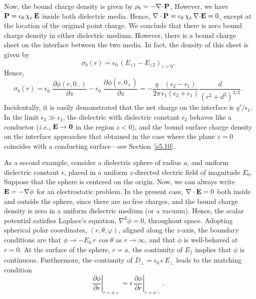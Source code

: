 Now, the bound charge density is given by $\rho_b = - \nabla\!\cdot\!
{\bf P}$, However,  we have ${\bf P}=\epsilon_0\,
\chi_e \,{\bf E}$ inside both dielectric media. Hence, $\nabla \cdot {\bf P} = \epsilon_0\,
\chi_e\, \nabla {\cdot} {\bf E} = 0$, except at the location of the original point charge. 
We conclude that there is zero  bound charge density in either dielectric
medium.  However,  
there is a bound charge sheet on the interface
between the two  media. 
In fact, the density of this sheet is given by
\begin{equation}
\sigma_b(r) = \epsilon_0\,(E_{z\,1}-E_{z\,2})_{z=0}.
\end{equation}
Hence,
\begin{equation}
\sigma_b(r) = \epsilon_0\,\,\frac{\partial\phi(r,0_-)}{\partial z}-
\epsilon_0\,\,\frac{\partial\phi(r,0_+)}{\partial z}
=-\frac{q}{2\pi} \frac{(\epsilon_2-\epsilon_1)}
{\epsilon_1(\epsilon_2+\epsilon_1)} \frac{d}{(r^2+d^2)^{3/2}}.
\end{equation}
Incidentally, it is easily demonstrated that the net charge on the interface
is $q'/\epsilon_1$. 
In the limit $\epsilon_2\gg \epsilon_1$, the dielectric with dielectric constant  $\epsilon_2$
behaves like a conductor ({\em i.e.}, ${\bf E}\rightarrow
{\bf 0}$ in the region $z<0$), 
and the bound surface charge  density 
on the interface approaches that obtained in the case where the plane
$z=0$ coincides with a conducting surface---see Section~\ref{s5.10}.

As a second example, consider a dielectric sphere of radius $a$, and
uniform dielectric constant $\epsilon$, placed in a uniform
$z$-directed electric field of magnitude $E_0$. Suppose that the
sphere is centered on the origin. Now, we
can always write ${\bf E}=-\nabla\phi$ for an electrostatic problem. In the present case, $\nabla\cdot{\bf E}=0$ both inside and outside the sphere, since there are no free charges, and the bound  charge density is zero in a uniform 
dielectric medium (or a vacuum). Hence, the scalar potential satisfies Laplace's equation, $\nabla^2\phi=0$, throughout space. Adopting spherical polar coordinates,
$(r, \theta, \varphi)$, aligned along the $z$-axis, the boundary conditions are that $\phi\rightarrow
- E_0\,r\,\cos\theta$ as $r\rightarrow\infty$, and that $\phi$ is well-behaved at
$r=0$. At the surface of the sphere, $r=a$, the continuity of $E_\parallel$
implies that $\phi$ is  continuous. Furthermore, the
continuity of $D_\perp=\epsilon_0\,\epsilon\,E_\perp$ leads to the matching condition
\begin{equation}\label{emat}
\left.\frac{\partial \phi}{\partial r}\right|_{r=a+} = \left.\epsilon\,
\frac{\partial\phi}{\partial r}\right|_{r=a-}.
\end{equation}

